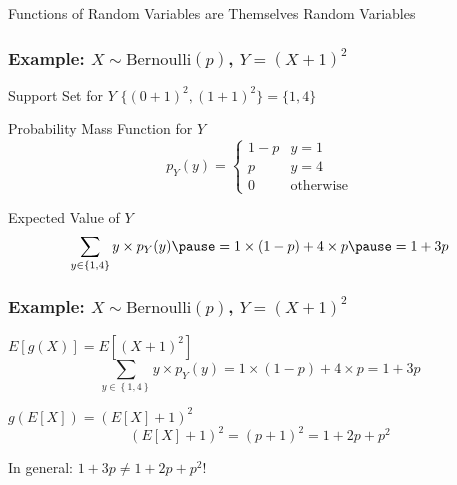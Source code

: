 \begin{frame}
\begin{center}
\Huge Functions of Random Variables are Themselves Random Variables
\end{center}

\end{frame}
\begin{frame}
  \frametitle{Example: $X\sim \mbox{Bernoulli}(p)$, $Y = (X+1)^2$}

\begin{block}{Support Set for $Y$} \pause
$\{(0 + 1)^2, (1 + 1)^2\} =\{1, 4\}$
\end{block}

\begin{block}{Probability Mass Function for $Y$} \pause
	$$p_Y(y) = \left\{\begin{array}{ll} 1-p& y = 1\\ p& y = 4\\ 0& \mbox{otherwise}\end{array}\right.$$
\end{block}

\pause
\begin{block}{Expected Value of $Y$}
  \[
    \sum_{y\in \left\{ 1,4 \right\}} y \times p_Y(y) \pause = 1 \times (1 - p )  + 4 \times p \pause = 1 + 3p
  \]
\end{block}

\end{frame}
\begin{frame}
  \frametitle{Example: $X\sim \mbox{Bernoulli}(p)$, $Y = (X+1)^2$}


  \begin{block}{$E[g(X)] = E[(X+1)^2]$}
  \[
    \sum_{y\in \left\{ 1,4 \right\}} y \times p_Y(y)  = 1 \times (1 - p )  + 4 \times p  = 1 + 3p
  \]
\end{block}

\pause

\begin{block}{$g(E[X]) = (E[X] + 1)^2$}
  \[\left(E[X] + 1\right)^2 = (p + 1)^2 = 1 + 2p + p^2\]
\end{block}

\pause

\begin{alertblock}{In general: $1 + 3p \neq 1 + 2p + p^2$!}
\end{alertblock}

\end{frame}


